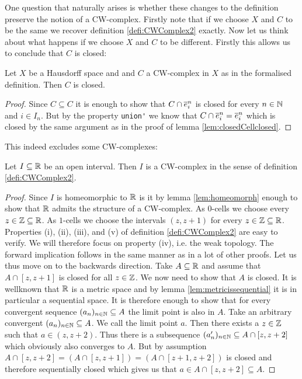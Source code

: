 One question that naturally arises is whether these changes to the definition preserve the notion of a CW-complex. 
Firstly note that if we choose $X$ and $C$ to be the same we recover definition \ref{defi:CWComplex2} exactly. 
Now let us think about what happens if we choose $X$ and $C$ to be different. 
Firstly this allows us to conclude that $C$ is closed: 

\begin{lem} \label{lem:Cclosed}
  Let $X$ be a Hausdorff space and and $C$ a CW-complex in $X$ as in the formalised definition. 
  Then $C$ is closed.
\end{lem}
\begin{proof}
  Since $C \subseteq C$ it is enough to show that $C \cap \closedCell{n}{i}$ is closed for every $n \in \bN$ and $i \in I_n$. 
  But by the property \lstinline{union'} we know that $C \cap \closedCell{n}{i} = \closedCell{n}{i}$ which is closed by the same argument as in the proof of lemma \ref{lem:closedCellclosed}.
\end{proof}

This indeed excludes some CW-complexes: 

\begin{example}
  Let $I \subseteq \bR$ be an open interval. 
  Then $I$ is a CW-complex in the sense of definition \ref{defi:CWComplex2}.
\end{example}
\begin{proof}
  Since $I$ is homeomorphic to $\bR$ is it by lemma \ref{lem:homeomorph} enough to show that $\bR$ admits the structure of a CW-complex. 
  As $0$-cells we choose every $z \in \bZ \subseteq \bR$. 
  As $1$-cells we choose the intervals $(z, z + 1)$ for every $z \in \bZ \subseteq \bR$.  
  Properties (i), (ii), (iii), and (v) of definition \ref{defi:CWComplex2} are easy to verify. 
  We will therefore focus on property (iv), i.e. the weak topology. 
  The forward implication follows in the same manner as in a lot of other proofs. 
  Let us thus move on to the backwards direction. 
  Take $A \subseteq \bR$ and assume that $A \cap [z, z + 1]$ is closed for all $z \in \bZ$. 
  We now need to show that $A$ is closed.
  It is wellknown that $\bR$ is a metric space and by lemma \ref{lem:metricissequential} it is in particular a sequential space. 
  It is therefore enough to show that for every convergent sequence $(a_n)_{n \in \bN} \subseteq A$ the limit point is also in $A$. 
  Take an arbitrary convergent $(a_n)_{n \in \bN} \subseteq A$. 
  We call the limit point $a$.
  Then there exists a $z \in \bZ$ such that $a \in (z, z + 2)$. 
  Thus there is a subsequence $(a'_n)_{n \in \bN} \subseteq A \cap [z, z + 2]$ which obviously also converges to $A$. 
  But by assumption $A \cap [z, z + 2] = (A \cap [z, z + 1]) = (A \cap [z + 1, z + 2])$ is closed and therefore sequentially closed which gives us that $a \in A \cap [z, z + 2] \subseteq A$.
\end{proof}

